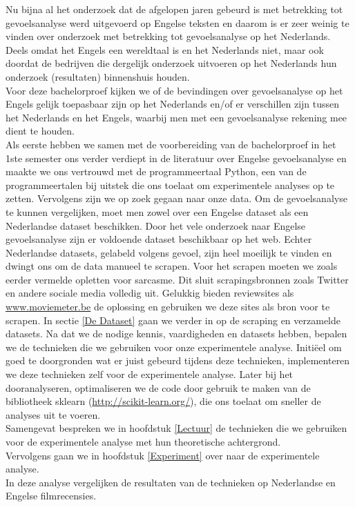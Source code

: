 Nu bijna al het onderzoek dat de afgelopen jaren gebeurd is met betrekking tot gevoelsanalyse werd uitgevoerd op Engelse teksten en daarom is er zeer weinig te vinden over onderzoek met betrekking tot gevoelsanalyse op het Nederlands. Deels omdat het Engels een wereldtaal is en het Nederlands niet, maar ook doordat de bedrijven die dergelijk onderzoek uitvoeren op het Nederlands hun onderzoek (resultaten) binnenshuis houden.
\\
Voor deze bachelorproef kijken we of de bevindingen over gevoelsanalyse op het Engels gelijk toepasbaar zijn op het Nederlands en/of er verschillen zijn tussen het Nederlands en het Engels, waarbij men met een gevoelsanalyse rekening mee dient te houden.\\
Als eerste hebben we samen met de voorbereiding van de bachelorproef in het 1ste semester ons verder verdiept in de literatuur over Engelse gevoelsanalyse en maakte we ons vertrouwd met de programmeertaal Python, een van de programmeertalen bij uitstek die ons toelaat om experimentele analyses op te zetten. Vervolgens zijn we op zoek gegaan naar onze data. Om de gevoelsanalyse te kunnen vergelijken, moet men zowel over een Engelse dataset als een Nederlandse dataset beschikken. Door het vele onderzoek naar Engelse gevoelsanalyse zijn er voldoende dataset beschikbaar op het web. Echter Nederlandse datasets, gelabeld volgens gevoel, zijn heel moeilijk te vinden en dwingt ons om de data manueel te scrapen. Voor het scrapen moeten we zoals eerder vermelde opletten voor sarcasme. Dit sluit scrapingsbronnen zoals Twitter en andere sociale media volledig uit. Gelukkig bieden reviewsites als \url{www.moviemeter.be} de oplossing en gebruiken we deze sites als bron voor te scrapen. In sectie \ref{De Dataset} gaan we verder in op de scraping en verzamelde datasets. Na dat we de nodige kennis, vaardigheden en datasets hebben, bepalen we de technieken die we gebruiken voor onze experimentele analyse. Initi\"eel om goed te doorgronden wat er juist gebeurd tijdens deze technieken, implementeren we deze technieken zelf voor de experimentele analyse. Later bij het dooranalyseren, optimaliseren we de code door gebruik te maken van de bibliotheek sklearn (\url{http://scikit-learn.org/}), die ons toelaat om sneller de analyses uit te voeren.\\   
%
Samengevat bespreken we in hoofdstuk \ref{Lectuur} de technieken die we gebruiken voor de experimentele analyse met hun theoretische achtergrond. \\Vervolgens gaan we in hoofdstuk \ref{Experiment} over naar de experimentele analyse.\\ In deze analyse vergelijken de resultaten van de technieken op Nederlandse en Engelse filmrecensies.\\
